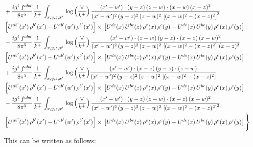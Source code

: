 \documentclass[9pt]{article}
\numberwithin{equation}{section}
\begin{document}
\begin{align}
& +\frac{ig^{4}\, f^{abd}}{8\pi^{5}}\, \frac{1}{k^{+}}\, \int_{x,y,z,x'}\,\log{\left(\frac{\vee}{k^{+}}\right)}\,\frac{(x'-w')\cdot  (y-z)\, (z-w)\cdot (x-w)\, (x-z)^{2}}{(x'-w')^{2}\, (y-z)^{2}\, (z-w)^{2}\,\left[(x-w)^{2}-(x-z)^{2}\right]^{2}}\, \notag \\ & \left[U^{ab'}(x')\,\rho^{b'}(x')-U^{ab'}(w')\, \rho^{b'}(x')\right]\times\,\left[U^{de}(x)\,U^{bc}(z)\, \rho^{e}(x)\,\rho^{c}(y)-U^{de}(x)\,U^{bc}(y)\,\rho^{e}(x)\,\rho^{c}(y)\right] \notag \\
& - \frac{ig^{4}\, f^{abd}}{8\pi^{5}}\, \frac{1}{k^{+}}\, \int_{x,y,z,x'}\,\log{\left(\frac{\vee}{k^{+}}\right)}\,\frac{(x'-w')\cdot (z-w)\, (y-z)\cdot (x-z)\, (x-w)^{2}}{(x'-w')^{2}\, (y-z)^{2}\, (z-w)^{2}\,\left[(x-w)^{2} - (x-z)^{2}\right]\, (x-z)^{2}}\, \notag \\ & \left[U^{ab'}(x')\,\rho^{b'}(x')-U^{ab'}(w')\, \rho^{b'}(x')\right]\times\,\left[U^{de}(x)\,U^{bc}(z)\, \rho^{e}(x)\,\rho^{c}(y)-U^{de}(x)\,U^{bc}(y)\,\rho^{e}(x)\,\rho^{c}(y)\right] \notag \\
& +\frac{ig^{4}\, f^{abd}}{8\pi^{5}}\, \frac{1}{k^{+}}\, \int_{x,y,z,x'}\,\log{\left(\frac{\vee}{k^{+}}\right)}\frac{(x'-w')\cdot (x-z)\, (y-z)\cdot (z-w)}{(x'-w')^{2}\, (y-z)^{2}\, (z-w)^{2}\,\left[(x-w)^{2} -(x-z)^{2}\right]}\, \notag \\ & \left[U^{ab'}(x')\,\rho^{b'}(x')-U^{ab'}(w')\, \rho^{b'}(x')\right]\times\,\left[U^{de}(x)\,U^{bc}(z)\, \rho^{e}(x)\,\rho^{c}(y)-U^{de}(x)\,U^{bc}(y)\,\rho^{e}(x)\,\rho^{c}(y)\right] \notag \\
& -\frac{ig^{4}\, f^{abd}}{8\pi^{5}}\, \frac{1}{k^{+}}\, \int_{x,y,z,x'}\,\log{\left(\frac{\vee}{k^{+}}\right)}\,\frac{(x'-w')\cdot (y-z)\, (z-w)\cdot (x-z)\,(x-w)^{2}}{(x'-w')^{2}\, (y-z)^{2}\, (z-w)^{2}\,\left[(x-w)^{2}-(x-z)^{2}\right]^{2}}\, \notag \\ & \left[U^{ab'}(x')\,\rho^{b'}(x')-U^{ab'}(w')\, \rho^{b'}(x')\right]\times\,\left[U^{de}(x)\,U^{bc}(z)\, \rho^{e}(x)\,\rho^{c}(y)-U^{de}(x)\,U^{bc}(y)\,\rho^{e}(x)\,\rho^{c}(y)\right]\Bigg\}
\end{align}
This can be written as follows: 
\end{document}
